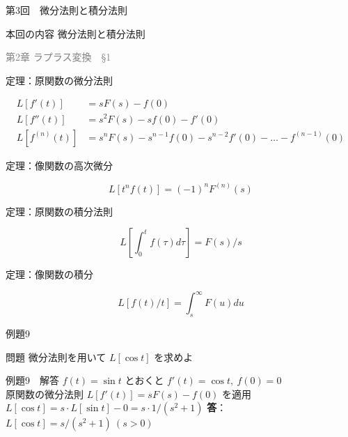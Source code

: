 \documentclass[professionalfonts]{beamer}
\begin{document}
\begin{frame}{第3回　微分法則と積分法則}
  \begin{block}{本回の内容}
  微分法則と積分法則
  \end{block}
  \vfill\hfill{\scriptsize \textcolor{gray}{第2章 ラプラス変換　§1}}
\end{frame}

\begin{frame}{定理：原関数の微分法則}
  \begin{block}{}
  \begin{align*}
    L[f'(t)]    &= sF(s) - f(0) \\
    L[f''(t)]   &= s^{2}F(s) - sf(0) - f'(0) \\
    L[f^{(n)}(t)] &= s^n F(s) - s^{n-1}f(0) - s^{n-2}f'(0) - \ldots - f^{(n-1)}(0)
  \end{align*}
  \end{block}
\end{frame}

\begin{frame}{定理：像関数の高次微分}
  \begin{block}{}
  \[
    L[t^n f(t)] = (-1)^n F^{(n)}(s)
  \]
  \end{block}
\end{frame}

\begin{frame}{定理：原関数の積分法則}
  \begin{block}{}
  \[
    L[\int_{0}^t f(\tau)d\tau] = F(s)/s
  \]
  \end{block}
\end{frame}

\begin{frame}{定理：像関数の積分}
  \begin{block}{}
  \[
    L[f(t)/t] = \int_{s}^\infty F(u)du
  \]
  \end{block}
\end{frame}

\begin{frame}{例題9}
  \begin{exampleblock}{問題}
    微分法則を用いて $L[\cos t]$ を求めよ\\[2pt]
  \end{exampleblock}
\end{frame}

\begin{frame}{例題9　解答}
  $f(t) = \sin t$ とおくと $f'(t) = \cos t,\ f(0) = 0$\\[4pt]
  原関数の微分法則 $L[f'(t)] = sF(s) - f(0)$ を適用\\[4pt]
  $L[\cos t] = s\cdot L[\sin t] - 0 = s\cdot 1/(s^{2}+1)$
  \medskip\textbf{答}：$L[\cos t] = s/(s^{2}+1) \ (s > 0)$
\end{frame}
\end{document}
